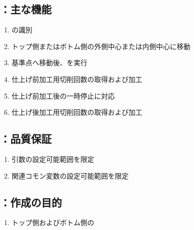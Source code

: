 \subsection{\KEndFaceCurvedOutCChamferRLeft：主な機能}
\begin{enumerate}[label*=\sarrow]
\item \OutcutExists の識別
\item トップ側またはボトム側の外側中心または内側中心に移動
\item 基準点へ移動後、\KOLeftFSZ を実行
\item 仕上げ前加工用切削回数の取得および加工
\item 仕上げ前加工後の一時停止\OpauseCheck に対応
\item 仕上げ後加工用切削回数の取得および加工
\end{enumerate}


\subsection{\KEndFaceCurvedOutCChamferRLeft：品質保証}
\begin{enumerate}[label*=\sarrow]
\item {}引数の設定可能範囲を限定
\item 関連コモン変数の設定可能範囲を限定
\end{enumerate}



\clearrightpage


\subsection{\KEndFaceInCChamferRLeft：作成の目的}
\begin{enumerate}[label*=\sarrow]
\item トップ側およびボトム側の\EndFaceInCChamferMilling
\end{enumerate}


